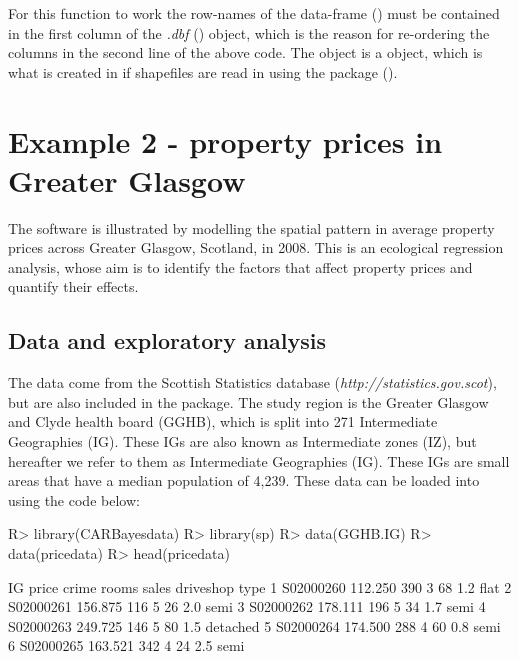 \documentclass[article,shortnames,nojss]{jss}
\begin{document}
For this function to work the row-names of the data-frame () must be contained in the first column of the \emph{.dbf} () object, which is the reason for re-ordering the columns in the second line of the above code. The  object is a  object, which is what is created in  if shapefiles are read in using the   package (\citealp{rgdal}). 


\section{Example 2 - property prices in Greater Glasgow}
The  software is illustrated by modelling the spatial pattern in average property prices across Greater Glasgow, Scotland, in 2008. This is an ecological regression analysis, whose aim is to  identify the factors that affect property prices and quantify their effects.


\subsection{Data and exploratory analysis}
The data come from the Scottish Statistics database (\emph{http://statistics.gov.scot}), but are also included in the   package. The study region is the Greater Glasgow and Clyde health board (GGHB), which is split into 271 Intermediate Geographies (IG). These IGs are also known as Intermediate zones (IZ), but hereafter we refer to them as Intermediate Geographies (IG). These IGs are small areas that have a median population of 4,239. These data can be loaded into  using the code below:
    
    
\begin{Schunk}
\begin{Sinput}
R> library(CARBayesdata)
R> library(sp)
R> data(GGHB.IG)
R> data(pricedata)
R> head(pricedata)
\end{Sinput}
\begin{Soutput}
         IG   price crime rooms sales driveshop     type
1 S02000260 112.250   390     3    68       1.2     flat
2 S02000261 156.875   116     5    26       2.0     semi
3 S02000262 178.111   196     5    34       1.7     semi
4 S02000263 249.725   146     5    80       1.5 detached
5 S02000264 174.500   288     4    60       0.8     semi
6 S02000265 163.521   342     4    24       2.5     semi
\end{Soutput}
\end{Schunk}
    
\end{document}
